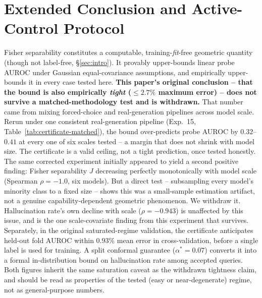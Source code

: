 \documentclass[onecolumn]{jmlr}
\begin{document}
\FloatBarrier
\section{Extended Conclusion and Active-Control Protocol}
\label{sec:conclusion}

Fisher separability constitutes a computable, training-\emph{fit}-free
geometric quantity (though not label-free, \S\ref{sec:intro}). It
provably upper-bounds linear probe AUROC under Gaussian
equal-covariance assumptions, and empirically upper-bounds it in every
case tested here. \textbf{This paper's original conclusion -- that the
bound is also empirically \emph{tight} ($\leq 2.7\%$ maximum error) --
does not survive a matched-methodology test and is withdrawn.} That
number came from mixing forced-choice and real-generation pipelines
across model scale. Rerun under one consistent real-generation pipeline
(Exp.~15, Table~\ref{tab:certificate-matched}), the bound over-predicts
probe AUROC by $0.32$--$0.41$ at every one of six scales tested -- a
margin that does not shrink with model size. The certificate is a
valid ceiling, not a tight prediction, once tested honestly. The same
corrected experiment initially appeared to yield a second positive
finding: Fisher separability $J$ decreasing perfectly monotonically
with model scale (Spearman $\rho=-1.0$, six models). But a direct test
-- subsampling every model's minority class to a fixed size -- shows
this was a small-sample estimation artifact, not a genuine
capability-dependent geometric phenomenon. We withdraw it.
Hallucination rate's own decline with scale ($\rho=-0.943$) is
unaffected by this issue, and is the one scale-covariate finding from
this experiment that survives. Separately, in the original
saturated-regime validation, the certificate anticipates held-out fold
AUROC within $0.93\%$ mean error in cross-validation, before a single
label is used for training. A split conformal guarantee ($\alpha^* =
0.07$) converts it into a formal in-distribution bound on hallucination
rate among accepted queries. Both figures inherit the same saturation
caveat as the withdrawn tightness claim, and should be read as
properties of the tested (easy or near-degenerate) regime, not as
general-purpose numbers.
\end{document}
